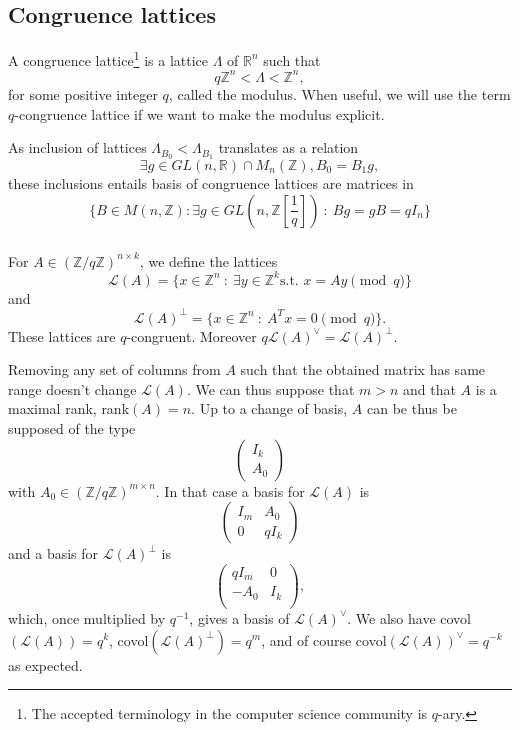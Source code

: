 \documentclass{article}
\begin{document}
\subsection{Congruence lattices} %
A congruence lattice\footnote{The accepted terminology in the computer science community is $q$-ary.} is a lattice $\Lambda$ of $\mathbb R^n$ such that 
\[q\mathbb Z^n < \Lambda < \mathbb Z^n,\]
for some positive integer $q$, called the modulus. When useful, we will use the term $q$-congruence lattice if we want to make the modulus explicit.
 
As inclusion of lattices $\Lambda_{B_0} < \Lambda_{B_1}$ translates as a relation
\[\exists g \in  GL(n,\mathbb R) \cap M_n(\mathbb Z) , B_0 = B_1g , \] 
these inclusions entails basis of congruence lattices are matrices in 
\[\{B\in M(n,\mathbb Z) : \exists g\in GL(n,\mathbb Z[\frac{1}{q}] ) \ : \ Bg = gB = qI_n \}\]
   
\subsubsection{}

For $A\in (\mathbb Z/q\mathbb Z)^{n\times k}$, we define the lattices
\[\mathcal L(A) = \{x\in\mathbb Z^{n} \ : \ \exists y\in\mathbb Z^k \text{s.t. } x = Ay \pmod{q} \}\]
and
\[\mathcal L(A)^\perp = \{x\in\mathbb Z^{n} \ :\ A^{T}x = 0 \pmod{q} \}.\]
These lattices are $q$-congruent. Moreover $q\mathcal L(A)^\vee = \mathcal L(A)^\perp$.   

Removing any set of columns from $A$ such that the obtained matrix has same range doesn't change $\mathcal L(A)$. We can thus suppose that $m>n$ and that $A$ is a maximal rank, rank$(A)=n$. Up to a change of basis, $A$ can be thus be supposed of the type 
\[\begin{pmatrix}
I_k \\
A_0
\end{pmatrix}\]
with $A_0\in (\mathbb Z/q\mathbb Z)^{m\times n}$. In that case a basis for $\mathcal L(A)$ is 
\[
\begin{pmatrix}
  I_m & A_0 \\ 0 & qI_k 
\end{pmatrix}
\]
and a basis for $\mathcal L(A)^\perp$ is 
\[
\begin{pmatrix}
  q I_m & 0 \\  - A_0 & I_k \\
\end{pmatrix},
\]
which, once multiplied by $q^{-1}$, gives a basis of $\mathcal L(A)^\vee$. We also have covol$(\mathcal L(A))=q^{k}$, covol$(\mathcal L(A)^\perp)=q^{m}$, and of course covol$(\mathcal L(A))^\vee=q^{-k}$ as expected.
\end{document}
